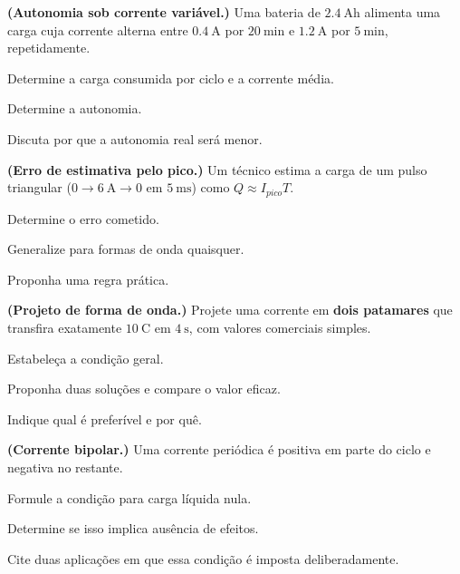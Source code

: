 \blocodesafio
\begin{questao}[4]{}

\textbf{(Autonomia sob corrente variável.)} Uma bateria de
$\SI{2.4}{\ampere\hour}$ alimenta uma carga cuja corrente alterna entre
$\SI{0.4}{\ampere}$ por $\SI{20}{\minute}$ e $\SI{1.2}{\ampere}$ por
$\SI{5}{\minute}$, repetidamente.
\begin{itensq}
\item Determine a carga consumida por ciclo e a corrente média.
\item Determine a autonomia.
\item Discuta por que a autonomia real será menor.
\end{itensq}


\end{questao}
\begin{questao}[4]{}

\textbf{(Erro de estimativa pelo pico.)} Um técnico estima a carga de um pulso
triangular ($0\to\SI{6}{\ampere}\to0$ em $\SI{5}{\milli\second}$) como
$Q\approx I_{pico}T$.
\begin{itensq}
\item Determine o erro cometido.
\item Generalize para formas de onda quaisquer.
\item Proponha uma regra prática.
\end{itensq}


\end{questao}
\begin{questao}[4]{}

\textbf{(Projeto de forma de onda.)} Projete uma corrente em \textbf{dois
patamares} que transfira exatamente $\SI{10}{\coulomb}$ em
$\SI{4}{\second}$, com valores comerciais simples.
\begin{itensq}
\item Estabeleça a condição geral.
\item Proponha duas soluções e compare o valor eficaz.
\item Indique qual é preferível e por quê.
\end{itensq}


\end{questao}
\begin{questao}[4]{}

\textbf{(Corrente bipolar.)} Uma corrente periódica é positiva em parte do
ciclo e negativa no restante.
\begin{itensq}
\item Formule a condição para carga líquida nula.
\item Determine se isso implica ausência de efeitos.
\item Cite duas aplicações em que essa condição é imposta deliberadamente.
\end{itensq}


\end{questao}
